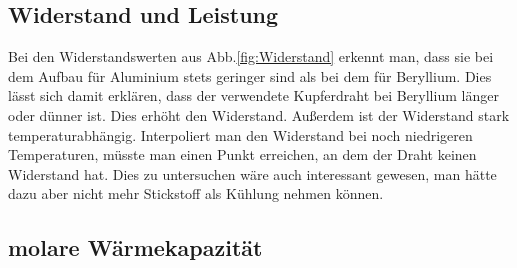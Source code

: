 \documentclass[12pt,a4paper,titlepage,headinclude,bibtotoc]{scrartcl}
\begin{document}
\subsection{Widerstand und Leistung}
Bei den Widerstandswerten aus Abb.\ref{fig:Widerstand} erkennt man, dass sie bei dem Aufbau für Aluminium stets geringer sind als bei dem für Beryllium.
Dies lässt sich damit erklären, dass der verwendete Kupferdraht bei Beryllium länger oder dünner ist.
Dies erhöht den Widerstand.
Außerdem ist der Widerstand stark temperaturabhängig.
Interpoliert man den Widerstand bei noch niedrigeren Temperaturen, müsste man einen Punkt erreichen, an dem der Draht keinen Widerstand hat.
Dies zu untersuchen wäre auch interessant gewesen, man hätte dazu aber nicht mehr Stickstoff als Kühlung nehmen können.

\subsection{molare Wärmekapazität}



\end{document}
